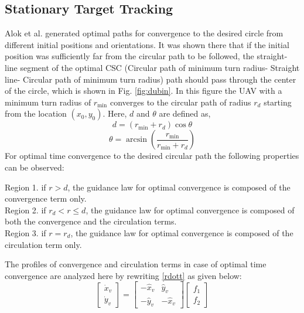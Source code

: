 \documentclass[Afour,sagev,times]{sagej}
\begin{document}
\subsection{Stationary Target Tracking}
Alok et al.\cite{ranjanatime} generated optimal paths for convergence to the desired circle from different initial positions and orientations. It was shown there that if the initial position was sufficiently far from the circular path to be followed, the straight-line segment of the optimal CSC (Circular path of minimum turn radius- Straight line- Circular path  of minimum turn radius) path should pass through the center of the circle, which is shown in Fig.   \ref{fig:dubin}. In this figure the UAV with a minimum turn radius of $r_{\min }$  converges to the circular path of radius ${r_d}$  starting from the location $(x_0,y_0)$.
Here, $d$ and $\theta$ are defined as,
\begin{equation}
d = ({r_{\min }} + {r_d})\cos {\theta} 
\end{equation}
\begin{equation}
\theta  = \arcsin\left( {\frac{{{r_{\min }}}}{{{r_{\min }} + {r_d}}}} \right)
\end{equation}
For optimal time convergence to the desired circular path the following properties can be observed:

\noindent
Region 1. if $r > d$, the guidance law for optimal convergence is composed of the convergence term only.
\\Region 2. if $r_d< r\leq d$, the guidance law for optimal convergence is composed of both the convergence and the circulation terms.
\\Region 3. if $r={r_d}$, the guidance law for optimal convergence is composed of the circulation term only.

The profiles of convergence and circulation terms in case of optimal time convergence are analyzed here  by rewriting \eqref{rdott} as given below:
\begin{equation}
\begin{bmatrix}
\dot{x}_v\\ \dot{y}_v

\end{bmatrix}=\begin{bmatrix}
-\hat{x}_v &\hat{y}_v \\ 
-\hat{y}_v& -\hat{x}_v
\end{bmatrix}\begin{bmatrix}
f_{1}\\f_{2} 

\end{bmatrix}
\end{equation}
\end{document}
